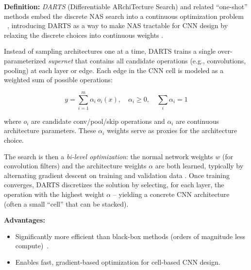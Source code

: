 \begin{comment}
DARTS reformulates NAS as a differentiable optimization problem~\cite{liu2018darts}. Instead of searching in a discrete space, it relaxes architecture choices into continuous parameters that can be optimized via gradient descent.
\end{comment}

\textbf{Definition:} \textit{DARTS} (Differentiable ARchiTecture Search) and related ``one-shot'' methods embed the discrete NAS search into a continuous optimization problem ~\cite{liu2018darts}, introducing DARTS as a way to make NAS tractable for CNN design by relaxing the discrete choices into continuous weights \cite{elsken2019neural}.

Instead of sampling architectures one at a time, DARTS trains a single over-parameterized \textit{supernet} \cite{SuperNet} that contains all candidate operations (e.g., convolutions, pooling) at each layer or edge. Each edge in the CNN cell is modeled as a weighted sum of possible operations:

\begin{equation}
y = \sum_{i=1}^{m} \alpha_i \, o_i(x), \quad \alpha_i \geq 0, \quad \sum_{i} \alpha_i = 1
\end{equation}

where $o_i$ are candidate conv/pool/skip operations and $\alpha_i$ are continuous architecture parameters. These $\alpha_i$ weights serve as proxies for the architecture choice.


The search is then a \textit{bi-level optimization}: the normal network weights $w$ (for convolution filters) and the architecture weights $\alpha$ are both learned, typically by alternating gradient descent on training and validation data \cite{elsken2019neural}. Once training converges, DARTS discretizes the solution by selecting, for each layer, the operation with the highest weight $\alpha$ – yielding a concrete CNN architecture (often a small ``cell'' that can be stacked).


\textbf{Advantages:}
\begin{itemize}
    \item Significantly more efficient than black-box methods (orders of magnitude less compute)~\cite{liu2018darts}.
    \item Enables fast, gradient-based optimization for cell-based CNN design.
\end{itemize}

